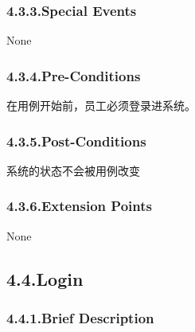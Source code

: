 \documentclass{article}
\begin{document}
\subsubsection{4.3.3.\hspace*{0.5em}Special Events}\label{sec-special-events}%

\noindent{}None%

\subsubsection{4.3.4.\hspace*{0.5em}Pre-Conditions}\label{sec-pre-conditions}%

\noindent{}在用例开始前，员工必须登录进系统。%

\subsubsection{4.3.5.\hspace*{0.5em}Post-Conditions}\label{sec-post-conditions}%

\noindent{}系统的状态不会被用例改变%

\subsubsection{4.3.6.\hspace*{0.5em}Extension Points}\label{sec-extension-points}%

\noindent{}None%

\subsection{4.4.\hspace*{0.5em}Login}\label{sec-login}%

\subsubsection{4.4.1.\hspace*{0.5em}Brief Description}\label{sec-brief-description}%
\end{document}
